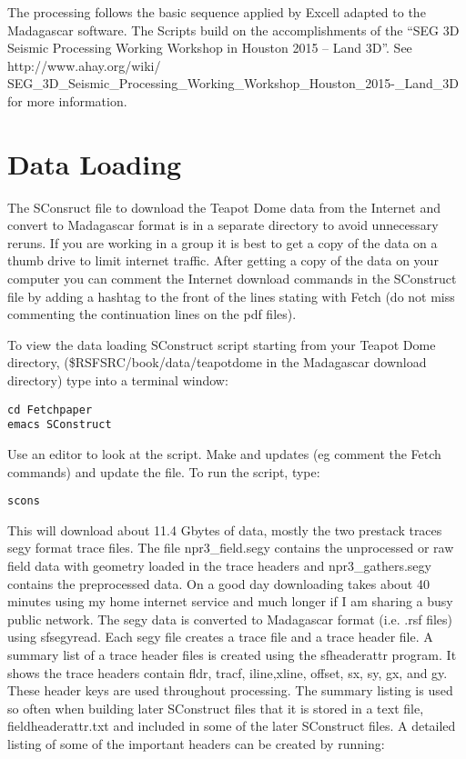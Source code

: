 The processing follows the basic sequence applied by Excell adapted to the Madagascar software.  The Scripts build on the accomplishments of the “SEG 3D Seismic Processing Working Workshop in Houston 2015 – Land 3D”.  See http://www.ahay.org/wiki/ SEG\_3D\_Seismic\_Processing\_Working\_Workshop\_Houston\_2015-\_Land\_3D for more information.

\section{Data Loading}
The SConsruct file to download the Teapot Dome data from the Internet and convert to Madagascar format is in a separate directory to avoid unnecessary reruns.  If you are working in a group it is best to get a copy of the data on a thumb drive to limit internet traffic.  After getting a copy of the data on your computer you can comment the Internet download commands in the SConstruct file by adding a hashtag to the front of the lines stating with Fetch (do not miss commenting the continuation lines on the pdf files).

To view the data loading SConstruct script starting from your Teapot Dome directory, (\$RSFSRC/book/data/teapotdome in the Madagascar download directory) type into a terminal window:

\begin{verbatim}
cd Fetchpaper
emacs SConstruct
\end{verbatim}  

Use an editor to look at the script.  Make and updates (eg comment the Fetch
commands) and update the file.  To run the script, type:

\begin{verbatim}
scons 
\end{verbatim}  

This will download about 11.4 Gbytes of data, mostly the two prestack traces segy format trace files.  The file npr3\_field.segy contains the unprocessed or raw field data with geometry loaded in the trace headers and npr3\_gathers.segy contains the preprocessed data.  On a good day downloading takes about 40 minutes using my home internet service and much longer if I am sharing a busy public network.   The segy data is converted to Madagascar format (i.e. .rsf files) using sfsegyread.  Each segy file creates a trace file and a trace header file.  A summary list of a trace header files is created using the sfheaderattr program.  It shows the trace headers contain fldr, tracf, iline,xline, offset, sx, sy, gx, and gy.  These header keys are used throughout processing.  The summary listing is used so often when building later SConstruct files that it is stored in a text file, fieldheaderattr.txt and included in some of the later SConstruct files.  A detailed listing of some of the important headers can be created by running:

